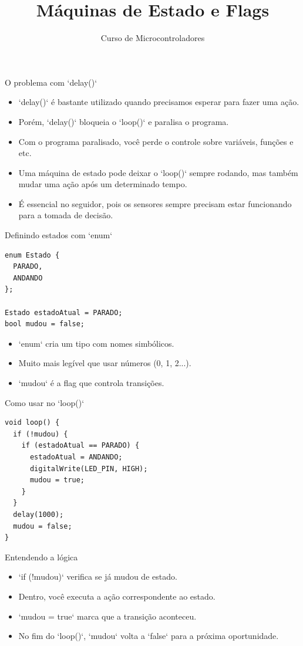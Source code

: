 \documentclass[10pt]{beamer}
\title{Máquinas de Estado e Flags}
\subtitle{Curso de Microcontroladores}
\author{}
\date{}
\begin{document}
\begin{frame}
  \titlepage
\end{frame}

\begin{frame}{O problema com `delay()`}
  \begin{itemize}
    \item `delay()` é bastante utilizado quando precisamos esperar para fazer uma ação.
    \item Porém, `delay()` bloqueia o `loop()` e paralisa o programa.
    \item Com o programa paralisado, você perde o controle sobre variáveis, funções e etc.
    \item Uma máquina de estado pode deixar o `loop()` sempre rodando, mas também mudar uma ação após um determinado tempo.
    \item É essencial no seguidor, pois os sensores sempre precisam estar funcionando para a tomada de decisão.
  \end{itemize}
\end{frame}

\begin{frame}[fragile]{Definindo estados com `enum`}
\begin{lstlisting}
enum Estado {
  PARADO,
  ANDANDO
};

Estado estadoAtual = PARADO;
bool mudou = false;
\end{lstlisting}

  \begin{itemize}
    \item `enum` cria um tipo com nomes simbólicos.
    \item Muito mais legível que usar números (0, 1, 2...).
    \item `mudou` é a flag que controla transições.
  \end{itemize}
\end{frame}

\begin{frame}[fragile]{Como usar no `loop()`}
\begin{lstlisting}
void loop() {
  if (!mudou) {
    if (estadoAtual == PARADO) {
      estadoAtual = ANDANDO;
      digitalWrite(LED_PIN, HIGH);
      mudou = true;
    }
  }
  delay(1000);
  mudou = false;
}
\end{lstlisting}
\end{frame}

\begin{frame}{Entendendo a lógica}
  \begin{itemize}
    \item `if (!mudou)` verifica se já mudou de estado.
    \item Dentro, você executa a ação correspondente ao estado.
    \item `mudou = true` marca que a transição aconteceu.
    \item No fim do `loop()`, `mudou` volta a `false` para a próxima oportunidade.
  \end{itemize}
\end{frame}
\end{document}
